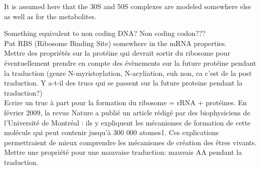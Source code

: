 It is assumed here that the 30S and 50S complexes are modeled somewhere else as well as for the metabolites.

\textcolor[rgb]{1.00,0.00,0.00}{Something equivalent to non coding DNA? Non coding codon???} \\
\textcolor[rgb]{1.00,0.00,0.00}{Put RBS (Ribosome Binding Site) somewhere in the mRNA properties.} \\
\textcolor[rgb]{1.00,0.00,0.00}{Mettre des propriétés sur la protéine qui devrait sortir du ribosome pour éventuellement prendre en compte des évènements sur la future protéine pendant la traduction (genre N-myristoylation, N-acyliation, euh non, ca c'est de la post traduction. Y a-t-il des trucs qui se passent sur la future proteine pendant la traduction?)} \\
\textcolor[rgb]{1.00,0.00,0.00}{Ecrire un truc à part pour la formation du ribosome = rRNA + protéines. En février 2009, la revue Nature a publié un article rédigé par des biophysiciens de l'Université de Montréal : ils y expliquent les mécanismes de formation de cette molécule qui peut contenir jusqu'à 300 000 atomes1. Ces explications permettraient de mieux comprendre les mécanismes de création des êtres vivants.} \\
\textcolor[rgb]{1.00,0.00,0.00}{Mettre une propriété pour une mauvaise traduction: mauvais AA pendant la traduction.} \\

